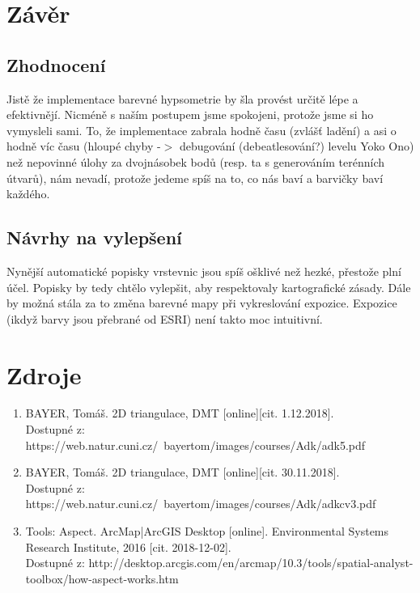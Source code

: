 \documentclass[a4paper, 12pt]{article}
\begin{document}
\section{Závěr}

\subsection{Zhodnocení}
Jistě že implementace barevné hypsometrie by šla provést určitě lépe a efektivnějí. Nicméně s naším postupem jsme spokojeni, protože jsme si ho vymysleli sami. To, že implementace zabrala hodně času (zvlášť ladění) a asi o hodně víc času (hloupé chyby -$>$ debugování (debeatlesování?) levelu Yoko Ono) než nepovinné úlohy za dvojnásobek bodů (resp. ta s generováním terénních útvarů), nám nevadí, protože jedeme spíš na to, co nás baví a barvičky baví každého.
\subsection{Návrhy na vylepšení}
Nynější automatické popisky vrstevnic jsou spíš ošklivé než hezké, přestože plní účel. Popisky by tedy chtělo vylepšit, aby respektovaly kartografické zásady. Dále by možná stála za to změna barevné mapy při vykreslování expozice. Expozice (ikdyž barvy jsou přebrané od ESRI) není takto moc intuitivní. 

\clearpage
\section{Zdroje}

\begin{enumerate}
\item  BAYER, Tomáš. 2D triangulace, DMT [online][cit. 1.12.2018]. \\
Dostupné z: https://web.natur.cuni.cz/~bayertom/images/courses/Adk/adk5.pdf  \\

\item  BAYER, Tomáš. 2D triangulace, DMT [online][cit. 30.11.2018]. \\
Dostupné z: https://web.natur.cuni.cz/~bayertom/images/courses/Adk/adkcv3.pdf\\

\item Tools: Aspect. ArcMap|ArcGIS Desktop [online]. Environmental Systems Research Institute, 2016 [cit. 2018-12-02]. \\
Dostupné z: http://desktop.arcgis.com/en/arcmap/10.3/tools/spatial-analyst-toolbox/how-aspect-works.htm\\
\end{enumerate}
\end{document}
